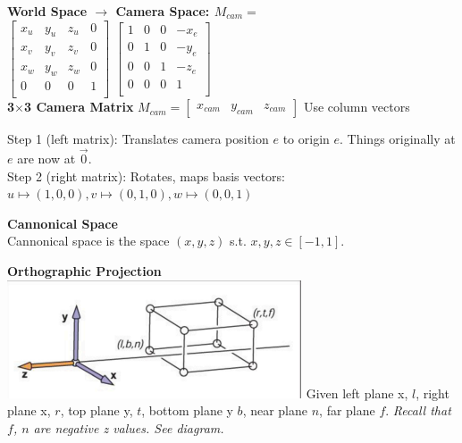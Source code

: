 \documentclass[letterpaper, 8pt]{extarticle}
\begin{document}
\begin{multicols*}{4}
    \textbf{World Space $\to$ Camera Space: $M_{cam}=$}\\
    \(
    \begin{bmatrix}
        x_u & y_u & z_u & 0 \\
        x_v & y_v & z_v & 0 \\
        x_w & y_w & z_w & 0 \\
        0   & 0   & 0   & 1 \\
    \end{bmatrix}
    \)
    \(
    \begin{bmatrix}
        1 & 0 & 0 & -x_e \\
        0 & 1 & 0 & -y_e \\
        0 & 0 & 1 & -z_e \\
        0 & 0 & 0 & 1    \\
    \end{bmatrix}
    \)
    \\

    \textbf{3\(\times\)3 Camera Matrix}
    \(
    M_{cam}
    = \begin{bmatrix}
        x_{cam} & y_{cam} & z_{cam}
    \end{bmatrix}
    \)
    Use column vectors

    Step 1 (left matrix): Translates camera position $e$ to origin $e$. Things originally at $e$ are now at $\vec{0}$.\\
    Step 2 (right matrix): Rotates, maps basis vectors: $u \mapsto (1,0,0), v \mapsto (0,1,0), w \mapsto (0,0,1)$

    \textbf{Cannonical Space}\\
    Cannonical space is the space $(x, y, z)$ s.t. $x,y,z \in [-1, 1]$.

    \textbf{Orthographic Projection}\\

    \includegraphics[width=.5\linewidth]{cam-ortho.png}
    Given left plane x, $l$, right plane x, $r$, top plane y, $t$, bottom plane y $b$, near plane $n$, far plane $f$.
    \textit{Recall that $f$, $n$ are negative z values. See diagram.}


\end{multicols*}
\end{document}
